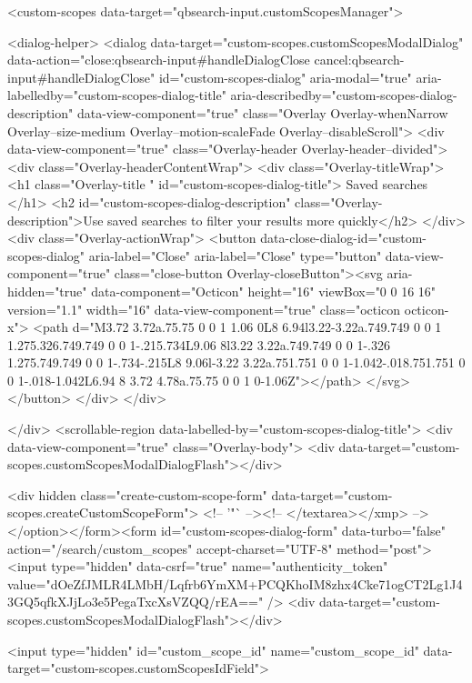     <custom-scopes data-target="qbsearch-input.customScopesManager">
    
<dialog-helper>
  <dialog data-target="custom-scopes.customScopesModalDialog" data-action="close:qbsearch-input#handleDialogClose cancel:qbsearch-input#handleDialogClose" id="custom-scopes-dialog" aria-modal="true" aria-labelledby="custom-scopes-dialog-title" aria-describedby="custom-scopes-dialog-description" data-view-component="true" class="Overlay Overlay-whenNarrow Overlay--size-medium Overlay--motion-scaleFade Overlay--disableScroll">
    <div data-view-component="true" class="Overlay-header Overlay-header--divided">
  <div class="Overlay-headerContentWrap">
    <div class="Overlay-titleWrap">
      <h1 class="Overlay-title " id="custom-scopes-dialog-title">
        Saved searches
      </h1>
        <h2 id="custom-scopes-dialog-description" class="Overlay-description">Use saved searches to filter your results more quickly</h2>
    </div>
    <div class="Overlay-actionWrap">
      <button data-close-dialog-id="custom-scopes-dialog" aria-label="Close" aria-label="Close" type="button" data-view-component="true" class="close-button Overlay-closeButton"><svg aria-hidden="true" data-component="Octicon" height="16" viewBox="0 0 16 16" version="1.1" width="16" data-view-component="true" class="octicon octicon-x">
    <path d="M3.72 3.72a.75.75 0 0 1 1.06 0L8 6.94l3.22-3.22a.749.749 0 0 1 1.275.326.749.749 0 0 1-.215.734L9.06 8l3.22 3.22a.749.749 0 0 1-.326 1.275.749.749 0 0 1-.734-.215L8 9.06l-3.22 3.22a.751.751 0 0 1-1.042-.018.751.751 0 0 1-.018-1.042L6.94 8 3.72 4.78a.75.75 0 0 1 0-1.06Z"></path>
</svg></button>
    </div>
  </div>
  
</div>
      <scrollable-region data-labelled-by="custom-scopes-dialog-title">
        <div data-view-component="true" class="Overlay-body">        <div data-target="custom-scopes.customScopesModalDialogFlash"></div>

        <div hidden class="create-custom-scope-form" data-target="custom-scopes.createCustomScopeForm">
        <!-- '"` --><!-- </textarea></xmp> --></option></form><form id="custom-scopes-dialog-form" data-turbo="false" action="/search/custom_scopes" accept-charset="UTF-8" method="post"><input type="hidden" data-csrf="true" name="authenticity_token" value="dOeZfJMLR4LMbH/Lqfrb6YmXM+PCQKhoIM8zhx4Cke71ogCT2Lg1J43GQ5qfkXJjLo3e5PegaTxcXsVZQQ/rEA==" />
          <div data-target="custom-scopes.customScopesModalDialogFlash"></div>

          <input type="hidden" id="custom_scope_id" name="custom_scope_id" data-target="custom-scopes.customScopesIdField">

